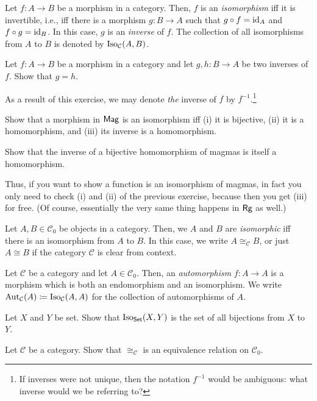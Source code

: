 \begin{dfn}[Isomorphism]
Let $f:A\rightarrow B$ be a morphism in a category.  Then, $f$ is an \emph{isomorphism} iff it is invertible, i.e., iff there is a morphism $g:B\rightarrow A$ such that $g\circ f=\operatorname{id} _A$ and $f\circ g=\operatorname{id} _B$.  In this case, $g$ is an \emph{inverse} of $f$.  The collection of all isomorphisms from $A$ to $B$ is denoted by $\operatorname{Iso} _{\mathcal{C}}(A,B)$.
\end{dfn}
\begin{exr}
Let $f:A\rightarrow B$ be a morphism in a category and let $g,h:B\rightarrow A$ be two inverses of $f$.  Show that $g=h$.
\begin{rmk}
As a result of this exercise, we may denote \emph{the} inverse of $f$ by $f^{-1}$.\footnote{If inverses were not unique, then the notation $f^{-1}$ would be ambiguous:  what inverse would we be referring to?}
\end{rmk}
\end{exr}
\begin{exr}
Show that a morphism in $\mathsf{Mag}$ is an isomorphism iff (i) it is bijective, (ii) it is a homomorphism, and (iii) its inverse is a homomorphism.
\end{exr}
\begin{exr}\label{exrA.2.11x}
Show that the inverse of a bijective homomorphism of magmas is itself a homomorphism.
\begin{rmk}
Thus, if you want to show a function is an isomorphism of magmas, in fact you only need to check (i) and (ii) of the previous exercise, because then you get (iii) for free.  (Of course, essentially the very same thing happens in $\mathsf{Rg}$ as well.)
\end{rmk}
\end{exr}
\begin{dfn}[Isomorphic]\label{dfnA.2.10}
Let $A,B\in \mathcal{C}_0$ be objects in a category.  Then, we $A$ and $B$ are \emph{isomorphic} iff there is an isomorphism from $A$ to $B$.  In this case, we write $A\cong _{\mathcal{C}}B$, or just $A\cong B$ if the category $\mathcal{C}$ is clear from context.
\end{dfn}
\begin{dfn}[Automorphisms]
Let $\mathcal{C}$ be a category and let $A\in \mathcal{C}_0$.  Then, an \emph{automorphism} $f:A\rightarrow A$ is a morphism which is both an endomorphism and an isomorphism.  We write $\operatorname{Aut} _{\mathcal{C}}(A)\coloneqq \operatorname{Iso} _{\mathcal{C}}(A,A)$ for the collection of automorphisms of $A$.
\end{dfn}
\begin{exr}\label{exr2.1.3}
Let $X$ and $Y$ be set.  Show that $\operatorname{Iso} _{\mathsf{Set}}(X,Y)$ is the set of all bijections from $X$ to $Y$.
\end{exr}
\begin{exr}\label{exrA.2.11}
Let $\mathcal{C}$ be a category.  Show that $\cong _{\mathcal{C}}$ is an equivalence relation on $\mathcal{C}_0$.
\end{exr}